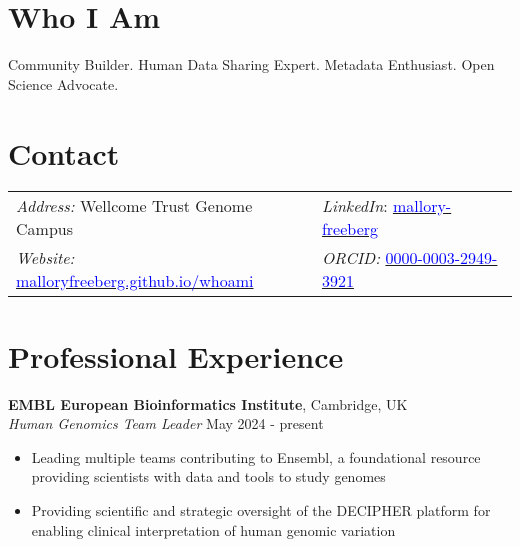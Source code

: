 \documentclass[margin,line]{res}
\begin{document}
\begin{resume}

\section{\sc Who I Am}
Community Builder. Human Data Sharing Expert. Metadata Enthusiast. Open Science Advocate.

\section{\sc Contact}
\begin{tabular}{@{}p{3in}p{3in}} %
{\it Address:} Wellcome Trust Genome Campus & {\em LinkedIn}: \href{https://www.linkedin.com/in/mallory-freeberg/}{\textcolor{blue}{mallory-freeberg}} \\
{\em Website:} \href{https://malloryfreeberg.github.io/whoami/}{\textcolor{blue}{malloryfreeberg.github.io/whoami}} & {\em ORCID:} \href{https://orcid.org/0000-0003-2949-3921}{\textcolor{blue}{0000-0003-2949-3921}} \\
\end{tabular}


\section{\sc Professional Experience}
{\bf EMBL European Bioinformatics Institute}, Cambridge, UK\\
{\em Human Genomics Team Leader} \hfill {May 2024 - present}
\begin{itemize}
\itemsep0em 
	\item Leading multiple teams contributing to Ensembl, a foundational resource providing scientists with data and tools to study genomes
	\item Providing scientific and strategic oversight of the DECIPHER platform for enabling clinical interpretation of human genomic variation
\end{itemize}


\end{resume}
\end{document}
